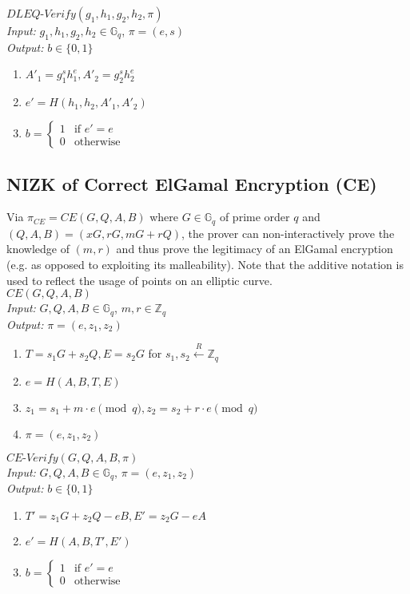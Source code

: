 \documentclass[letterpaper,twocolumn,10pt]{article}
\theoremstyle{definition}
\theoremstyle{remark}
\begin{document}
\noindent\underline{$DLEQ\text{-}Verify(g_1, h_1, g_2, h_2, \pi)$}\\
\textit{Input:} $g_1, h_1, g_2, h_2 \in \mathbb{G}_q$, $\pi = (e, s)$\\
\textit{Output:} $b \in \{0, 1\}$
\begin{enumerate}
\item $A'_1 = g_1^s h_1^e, A'_2 = g_2^s h_2^e$
\item $e' = H(h_1, h_2, A'_1, A'_2)$
\item $b = \begin{cases}
1 & \text{if $e' = e$}\\
0 & \text{otherwise}
\end{cases}$
\end{enumerate}

\subsection{NIZK of Correct ElGamal Encryption (CE)}
\label{appendix:ce}
Via $\pi_{CE} = CE(G, Q, A, B)$ \cite{cherniaeva2019homomorphic} where $G \in \mathbb{G}_q$ of prime order $q$ and $(Q, A, B) = (x G, r G, m G + r Q)$, the prover can non-interactively prove the knowledge of $(m, r)$ and thus prove the legitimacy of an ElGamal encryption (e.g. as opposed to exploiting its malleability). Note that the additive notation is used to reflect the usage of points on an elliptic curve.\\

\noindent\underline{$CE(G, Q, A, B)$}\\
\textit{Input:} $G, Q, A, B \in \mathbb{G}_q$, $m, r \in \mathbb{Z}_q$\\
\textit{Output:} $\pi = (e, z_1, z_2)$
\begin{enumerate}
\item $T = s_1 G + s_2 Q, E = s_2 G$ for $s_1, s_2 \xleftarrow{R} \mathbb{Z}_q$
\item $e = H(A, B, T, E)$
\item $z_1 = s_1 + m \cdot e \pmod q, z_2 = s_2 + r \cdot e \pmod q$
\item $\pi = (e, z_1, z_2)$
\end{enumerate}

\noindent\underline{$CE\text{-}Verify(G, Q, A, B, \pi)$}\\
\textit{Input:} $G, Q, A, B \in \mathbb{G}_q$, $\pi = (e, z_1, z_2)$\\
\textit{Output:} $b \in \{0, 1\}$
\begin{enumerate}
\item $T' = z_1 G + z_2 Q - e B, E' = z_2 G - e A$
\item $e' = H(A, B, T', E')$
\item $b = \begin{cases}
1 & \text{if $e' = e$}\\
0 & \text{otherwise}
\end{cases}$
\end{enumerate}
\end{document}
